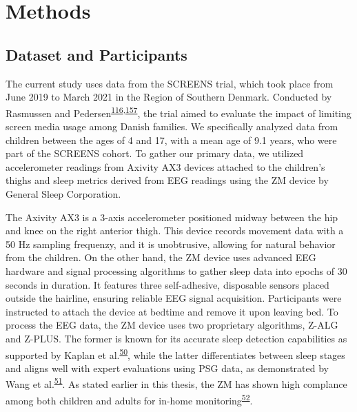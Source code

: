 \documentclass[
  10pt,
]{scrbook}
\begin{document}
\hypertarget{methods-2}{%
\section{Methods}\label{methods-2}}

\hypertarget{dataset-and-participants}{%
\subsection{Dataset and Participants}\label{dataset-and-participants}}

The current study uses data from the SCREENS trial, which took place
from June 2019 to March 2021 in the Region of Southern Denmark.
Conducted by Rasmussen and
Pedersen\textsuperscript{\protect\hyperlink{ref-rasmussen_short-term_2020}{116},\protect\hyperlink{ref-pedersen_effects_2022}{157}},
the trial aimed to evaluate the impact of limiting screen media usage
among Danish families. We specifically analyzed data from children
between the ages of 4 and 17, with a mean age of 9.1 years, who were
part of the SCREENS cohort. To gather our primary data, we utilized
accelerometer readings from Axivity AX3 devices attached to the
children's thighs and sleep metrics derived from EEG readings using the
ZM device by General Sleep Corporation.

The Axivity AX3 is a 3-axis accelerometer positioned midway between the
hip and knee on the right anterior thigh. This device records movement
data with a 50 Hz sampling frequenzy, and it is unobtrusive, allowing
for natural behavior from the children. On the other hand, the ZM device
uses advanced EEG hardware and signal processing algorithms to gather
sleep data into epochs of 30 seconds in duration. It features three
self-adhesive, disposable sensors placed outside the hairline, ensuring
reliable EEG signal acquisition. Participants were instructed to attach
the device at bedtime and remove it upon leaving bed. To process the EEG
data, the ZM device uses two proprietary algorithms, Z-ALG and Z-PLUS.
The former is known for its accurate sleep detection capabilities as
supported by Kaplan et
al.\textsuperscript{\protect\hyperlink{ref-kaplan_performance_2014}{50}},
while the latter differentiates between sleep stages and aligns well
with expert evaluations using PSG data, as demonstrated by Wang et
al.\textsuperscript{\protect\hyperlink{ref-wang_evaluation_2015}{51}}.
As stated earlier in this thesis, the ZM has shown high complance among
both children and adults for in-home
monitoring\textsuperscript{\protect\hyperlink{ref-pedersen_self-administered_2021}{52}}.
\end{document}
